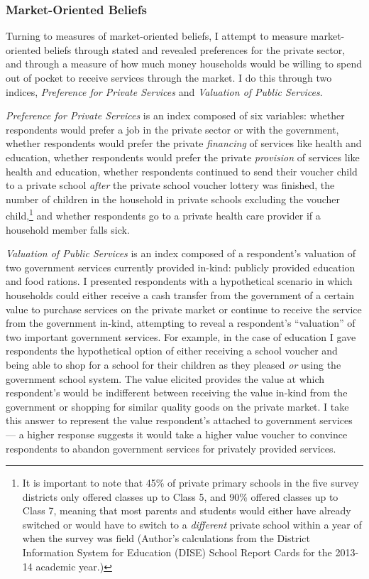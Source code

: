 \documentclass[hidelinks, 12pt, titlepage]{article}
\begin{document}
	\subsubsection*{Market-Oriented Beliefs}

		Turning to measures of market-oriented beliefs, I attempt to measure market-oriented beliefs through stated and revealed preferences for the private sector, and through a measure of how much money households would be willing to spend out of pocket to receive services through the market.  I do this through two indices, \emph{Preference for Private Services} and \emph{Valuation of Public Services}.

		\emph{Preference for Private Services} is an index composed of six variables: whether respondents would prefer a job in the private sector or with the government, whether respondents would prefer the private \emph{financing} of services like health and education, whether respondents would prefer the private \emph{provision} of services like health and education, whether respondents continued to send their voucher child to a private school \emph{after} the private school voucher lottery was finished, the number of children in the household in private schools excluding the voucher child,\footnote{It is important to note that 45\% of private primary schools in the five survey districts only offered classes up to Class 5, and 90\% offered classes up to Class 7, meaning that most parents and students would either have already switched or would have to switch to a \emph{different} private school within a year of when the survey was field (Author's calculations from the District Information System for Education (DISE) School Report Cards for the 2013-14 academic year.)} and whether respondents go to a private health care provider if a household member falls sick.

		\emph{Valuation of Public Services} is an index composed of a respondent's valuation of two government services currently provided in-kind: publicly provided education and food rations.  I presented respondents with a hypothetical scenario in which households could either receive a cash transfer from the government of a certain value to purchase services on the private market or continue to receive the service from the government in-kind, attempting to reveal a respondent's ``valuation'' of two important government services.  For example, in the case of education I gave respondents the hypothetical option of either receiving a school voucher and being able to shop for a school for their children as they pleased \emph{or} using the government school system.  The value elicited provides the value at which respondent's would be indifferent between receiving the value in-kind from the government or shopping for similar quality goods on the private market.  I take this answer to represent the value respondent's attached to government services --- a higher response suggests it would take a higher value voucher to convince respondents to abandon government services for privately provided services.
\end{document}
